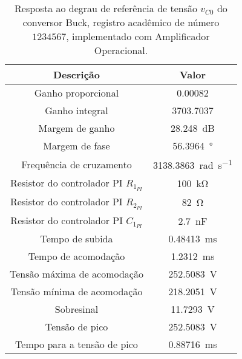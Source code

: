 \begin{table}[!ht]
\centering
\caption{Resposta ao degrau de referência de tensão $v_{C0}$ do conversor Buck, registro acadêmico de número $1234567$, implementado com Amplificador Operacional.}
\label{tab:resposta1malhaAmpOp}
\begin{tabular}{@{}cc@{}}
\toprule
\textbf{Descrição} & \textbf{Valor}\\ \midrule
Ganho proporcional & \SI{0.00082}{}\\
Ganho integral & \SI{3703.7037}{}\\
Margem de ganho & \SI{28.248}{\deci\bel}\\
Margem de fase & \SI{56.3964}{\degree}\\
Frequência de cruzamento & \SI{3138.3863}{\radian\per\s}\\
Resistor do controlador PI $R_{1_{PI}}$ & \SI{100}{\kilo\ohm}\\
Resistor do controlador PI $R_{2_{PI}}$ & \SI{82}{\ohm}\\
Resistor do controlador PI $C_{1_{PI}}$ & \SI{2.7}{\nano\F}\\
Tempo de subida & \SI{0.48413}{\milli\s}\\
Tempo de acomodação & \SI{1.2312}{\milli\s}\\
Tensão máxima de acomodação & \SI{252.5083}{\V}\\
Tensão mínima de acomodação & \SI{218.2051}{\V}\\
Sobresinal & \SI{11.7293}{\V}\\
Tensão de pico & \SI{252.5083}{\V}\\
Tempo para a tensão de pico & \SI{0.88716}{\milli\s}\\
\bottomrule
\end{tabular}
\end{table}

